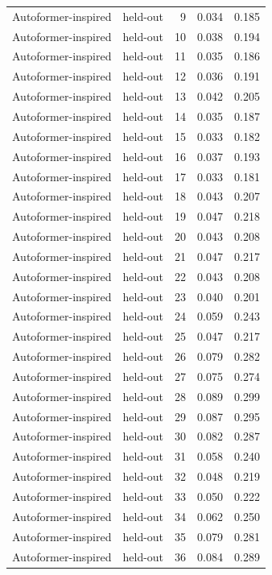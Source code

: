 \begin{tabular}{llrrr}
Autoformer-inspired & held-out & 9 & 0.034 & 0.185 \\
Autoformer-inspired & held-out & 10 & 0.038 & 0.194 \\
Autoformer-inspired & held-out & 11 & 0.035 & 0.186 \\
Autoformer-inspired & held-out & 12 & 0.036 & 0.191 \\
Autoformer-inspired & held-out & 13 & 0.042 & 0.205 \\
Autoformer-inspired & held-out & 14 & 0.035 & 0.187 \\
Autoformer-inspired & held-out & 15 & 0.033 & 0.182 \\
Autoformer-inspired & held-out & 16 & 0.037 & 0.193 \\
Autoformer-inspired & held-out & 17 & 0.033 & 0.181 \\
Autoformer-inspired & held-out & 18 & 0.043 & 0.207 \\
Autoformer-inspired & held-out & 19 & 0.047 & 0.218 \\
Autoformer-inspired & held-out & 20 & 0.043 & 0.208 \\
Autoformer-inspired & held-out & 21 & 0.047 & 0.217 \\
Autoformer-inspired & held-out & 22 & 0.043 & 0.208 \\
Autoformer-inspired & held-out & 23 & 0.040 & 0.201 \\
Autoformer-inspired & held-out & 24 & 0.059 & 0.243 \\
Autoformer-inspired & held-out & 25 & 0.047 & 0.217 \\
Autoformer-inspired & held-out & 26 & 0.079 & 0.282 \\
Autoformer-inspired & held-out & 27 & 0.075 & 0.274 \\
Autoformer-inspired & held-out & 28 & 0.089 & 0.299 \\
Autoformer-inspired & held-out & 29 & 0.087 & 0.295 \\
Autoformer-inspired & held-out & 30 & 0.082 & 0.287 \\
Autoformer-inspired & held-out & 31 & 0.058 & 0.240 \\
Autoformer-inspired & held-out & 32 & 0.048 & 0.219 \\
Autoformer-inspired & held-out & 33 & 0.050 & 0.222 \\
Autoformer-inspired & held-out & 34 & 0.062 & 0.250 \\
Autoformer-inspired & held-out & 35 & 0.079 & 0.281 \\
Autoformer-inspired & held-out & 36 & 0.084 & 0.289 \\

\end{tabular}
